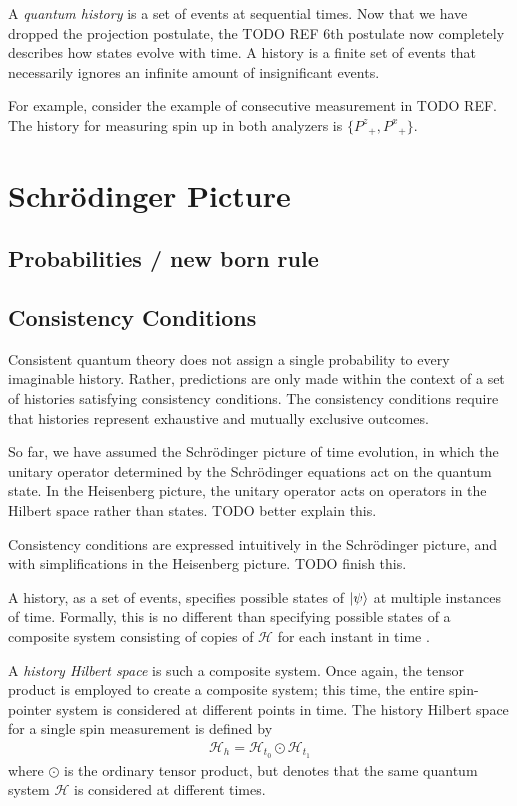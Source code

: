 A \textit{quantum history} is a set of events at sequential times. Now that we have dropped the projection postulate, the TODO REF 6th postulate now completely describes how states evolve with time. A history is a finite set of events that necessarily ignores an infinite amount of insignificant events.

For example, consider the example of consecutive measurement in TODO REF. The history for measuring spin up in both analyzers is $\{{P^z}_+, {P^x}_+\}$.

\section{Schrödinger Picture}
\subsection{Probabilities / new born rule}

\subsection{Consistency Conditions}

Consistent quantum theory does not assign a single probability to every imaginable history. Rather, predictions are only made within the context of a set of histories satisfying consistency conditions. The consistency conditions require that histories represent exhaustive and mutually exclusive outcomes.

So far, we have assumed the Schrödinger picture of time evolution, in which the unitary operator determined by the Schrödinger equations act on the quantum state. In the Heisenberg picture, the unitary operator acts on operators in the Hilbert space rather than states. TODO better explain this.

Consistency conditions are expressed intuitively in the Schrödinger picture, and with simplifications in the Heisenberg picture. TODO finish this.

A history, as a set of events, specifies possible states of $\ket{\psi}$ at multiple instances of time. Formally, this is no different than specifying possible states of a composite system consisting of copies of $\mathcal{H}$ for each instant in time \cite{Griffiths}.

A \textit{history Hilbert space} is such a composite system. Once again, the tensor product is employed to create a composite system; this time, the entire spin-pointer system is considered at different points in time. The history Hilbert space for a single spin measurement is defined by
\begin{align}
  {\mathcal{H}}_h = \mathcal{H}_{t_0} \odot \mathcal{H}_{t_1}
\end{align}
where $\odot$ is the ordinary tensor product, but denotes that the same quantum system $\mathcal{H}$ is considered at different times.

